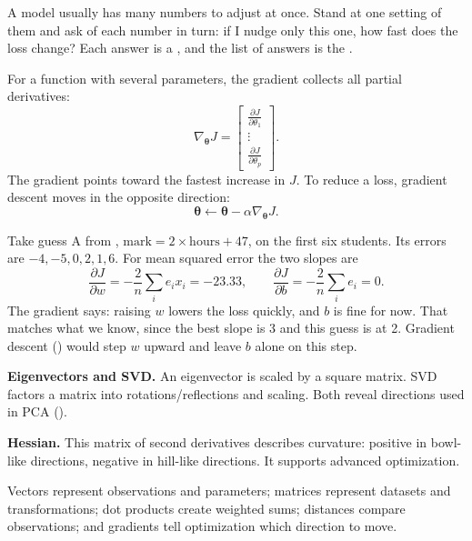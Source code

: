 A model usually has many numbers to adjust at once. Stand at one setting of them and ask of each number in turn: if I nudge only this one, how fast does the loss change? Each answer is a , and the list of answers is the .

For a function with several parameters, the gradient collects all partial derivatives:
\[
  \nabla_{\bm{\theta}}J=
  \begin{bmatrix}
  \frac{\partial J}{\partial\theta_1}\\
  \vdots\\
  \frac{\partial J}{\partial\theta_p}
  \end{bmatrix}.
\]
The gradient points toward the fastest increase in $J$. To reduce a loss, gradient descent moves in the opposite direction:
\[
  \bm{\theta}\leftarrow\bm{\theta}-\alpha\nabla_{\bm{\theta}}J.
\]

\begin{workedexample}
Take guess A from , $\text{mark}=2\times\text{hours}+47$, on the first six students. Its errors are $-4,-5,0,2,1,6$. For mean squared error the two slopes are
\[
  \frac{\partial J}{\partial w}=-\frac{2}{n}\sum_i e_ix_i=-23.33,
  \qquad
  \frac{\partial J}{\partial b}=-\frac{2}{n}\sum_i e_i=0.
\]
The gradient says: raising $w$ lowers the loss quickly, and $b$ is fine for now. That matches what we know, since the best slope is 3 and this guess is at 2. Gradient descent () would step $w$ upward and leave $b$ alone on this step.
\end{workedexample}

\begin{optionaltopic}
\textbf{Eigenvectors and SVD.} An eigenvector is scaled by a square matrix. SVD factors a matrix into rotations/reflections and scaling. Both reveal directions used in PCA ().
\end{optionaltopic}

\begin{optionaltopic}
\textbf{Hessian.} This matrix of second derivatives describes curvature: positive in bowl-like directions, negative in hill-like directions. It supports advanced optimization.
\end{optionaltopic}

\begin{keyidea}
Vectors represent observations and parameters; matrices represent datasets and transformations; dot products create weighted sums; distances compare observations; and gradients tell optimization which direction to move.
\end{keyidea}

